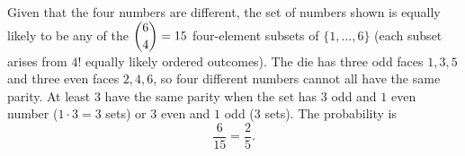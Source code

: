 Given that the four numbers are different, the set of numbers shown is equally likely to be any of the $\dbinom64=15$ four-element subsets of $\{1,\dots,6\}$ (each subset arises from $4!$ equally likely ordered outcomes). The die has three odd faces $1,3,5$ and three even faces $2,4,6$, so four different numbers cannot all have the same parity. At least $3$ have the same parity when the set has $3$ odd and $1$ even number ($1\cdot3=3$ sets) or $3$ even and $1$ odd ($3$ sets). The probability is
\[\dfrac{6}{15}=\boxed{\dfrac{2}{5}}.\]

